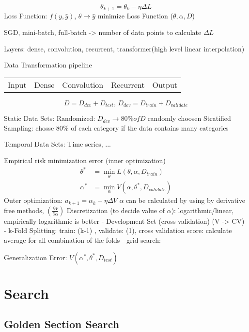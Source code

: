 \documentclass[12pt, letterpaper]{article}
\begin{document}
\fontsize{14pt}{18pt}\selectfont

\[\theta_{k+1} = \theta_k - \eta\Delta L\]
Loss Function: $f(y, \hat{y})$, $\theta \rightarrow \hat{y}$
minimize Loss Function ($\theta, \alpha, D$)

SGD, mini-batch, full-batch -> number of data points to calculate $\Delta L$

Layers: dense, convolution, recurrent, transformer(high level linear interpolation)

Data Transformation pipeline
\begin{tabular}{c | c | c | c | c}
  Input& Dense& Convolution& Recurrent& Output
\end{tabular}

\[
  D = D_{dev} + D_{test},\, D_{dev} = D_{train} + D_{validate}
\]

Static Data Sets:
Randomized: $D_{dev} \rightarrow 80\% of D$ randomly choosen
Stratified Sampling: chosse 80\% of each category if the data contains many categories

Temporal Data Sets: Time series, ...

Empirical risk minimization error (inner optimization)
\[
  \begin{split}
    \theta^* &= \min_{\theta}L(\theta, \alpha, D_{train})\\
    \alpha^* &= \min_{\alpha} V(\alpha, \theta^*, D_{validate})
  \end{split}
\]
Outer optimization: $a_{k+1} = \alpha_k - \eta\Delta V$
$\alpha$ can be calculated by using by derivative free methods, $\left( \frac{\partial V}{\partial\alpha} \right)$
Discretization (to decide value of $\alpha$): logarithmic/linear, empirically logarithmic is better
- Development Set (cross validation) (V -> CV)
  - k-Fold Splitting: train: (k-1) , validate: (1), cross validation score: calculate average for all combination of the folds
  - grid search: 


Generalization Error: $V(\alpha^*, \theta^*, D_{test})$
\newline

\section{Search}
\label{sec:search}

\subsection{Golden Section Search}
\label{sec:gold-sect-search}
\end{document}
